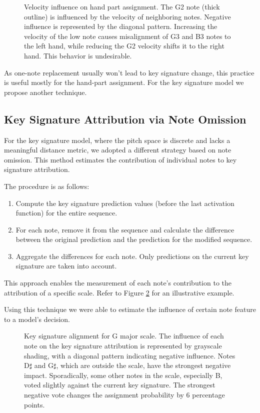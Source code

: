 \begin{figure}[ht!] \centering  \caption[Velocity influence on hand part assignment.]{Velocity influence on hand part assignment. The G2 note (thick outline) is influenced by the velocity of neighboring notes. Negative influence is represented by the diagonal pattern. Increasing the velocity of the low note causes misalignment of G3 and B3 notes to the left hand, while reducing the G2 velocity shifts it to the right hand. This behavior is undesirable.} \label{hand_part_misalignment} \end{figure}

As one-note replacement usually won't lead to key signature change, this practice is useful mostly for the hand-part assignment. For the key signature model we propose another technique.

\subsection{Key Signature Attribution via Note Omission}

For the key signature model, where the pitch space is discrete and lacks a meaningful distance metric, we adopted a different strategy based on note omission. This method estimates the contribution of individual notes to key signature attribution.

The procedure is as follows: \begin{enumerate}
	\item Compute the key signature prediction values (before the last activation function) for the entire sequence.
	\item For each note, remove it from the sequence and calculate the difference between the original prediction and the prediction for the modified sequence.
	\item Aggregate the differences for each note. Only predictions on the current key signature are taken into account.
	\end{enumerate} This approach enables the measurement of each note's contribution to the attribution of a specific scale. Refer to Figure \ref{note_removing} for an illustrative example.
	
Using this technique we were able to estimate the influence of certain note feature to a model's decision.

\begin{figure}[ht!] \centering  \caption[Key signature alignment for G major scale.]{Key signature alignment for G major scale. The influence of each note on the key signature attribution is represented by grayscale shading, with a diagonal pattern indicating negative influence. Notes D$\sharp$ and G$\sharp$, which are outside the scale, have the strongest negative impact. Sporadically, some other notes in the scale, especially B, voted slightly against the current key signature. The strongest negative vote changes the assignment probability by $6$ percentage points.}
\label{note_removing}\end{figure}

